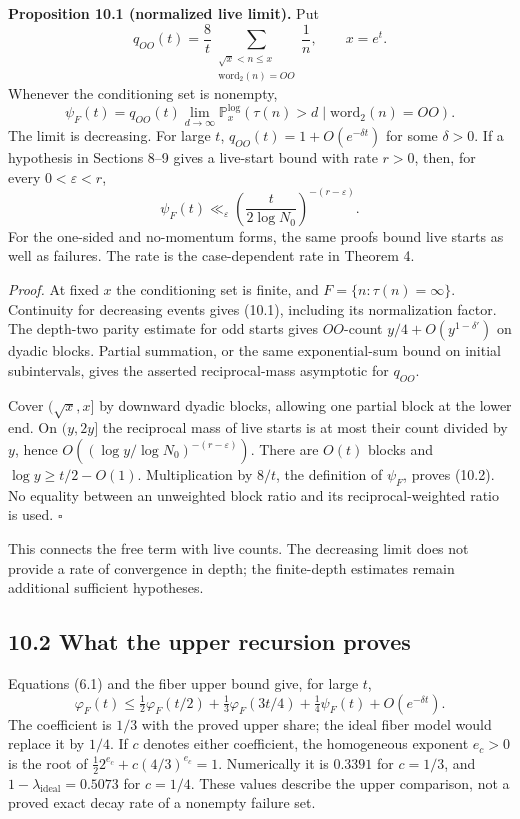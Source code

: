 \documentclass[11pt,a4paper]{article}
\begin{document}
\textbf{Proposition 10.1 (normalized live limit).} Put \[
q_{OO}(t)=\frac8t
 \sum_{\substack{\sqrt x<n\le x\\ \mathrm{word}_2(n)=OO}}\frac1n,
\qquad x=e^t.
\] Whenever the conditioning set is nonempty, \[
\psi_F(t)=q_{OO}(t)\lim_{d\to\infty}
 \mathbb P_x^{\log}(\tau(n)>d\mid\mathrm{word}_2(n)=OO).
\tag{10.1}
\] The limit is decreasing. For large \(t\),
\(q_{OO}(t)=1+O(e^{-\delta t})\) for some \(\delta>0\). If a hypothesis
in Sections 8--9 gives a live-start bound with rate \(r>0\), then, for
every \(0<\varepsilon<r\), \[
\psi_F(t)\ll_\varepsilon
 \left(\frac{t}{2\log N_0}\right)^{-(r-\varepsilon)}.
\tag{10.2}
\] For the one-sided and no-momentum forms, the same proofs bound live
starts as well as failures. The rate is the case-dependent rate in
Theorem 4.

\emph{Proof.} At fixed \(x\) the conditioning set is finite, and
\(F=\{n:\tau(n)=\infty\}\). Continuity for decreasing events gives
(10.1), including its normalization factor. The depth-two parity
estimate for odd starts gives \(OO\)-count \(y/4+O(y^{1-\delta'})\) on
dyadic blocks. Partial summation, or the same exponential-sum bound on
initial subintervals, gives the asserted reciprocal-mass asymptotic for
\(q_{OO}\).

Cover \((\sqrt x,x]\) by downward dyadic blocks, allowing one partial
block at the lower end. On \((y,2y]\) the reciprocal mass of live starts
is at most their count divided by \(y\), hence
\(O((\log y/\log N_0)^{-(r-\varepsilon)})\). There are \(O(t)\) blocks
and \(\log y\ge t/2-O(1)\). Multiplication by \(8/t\), the definition of
\(\psi_F\), proves (10.2). No equality between an unweighted block ratio
and its reciprocal-weighted ratio is used. \(\square\)

This connects the free term with live counts. The decreasing limit does
not provide a rate of convergence in depth; the finite-depth estimates
remain additional sufficient hypotheses.

\subsection{10.2 What the upper recursion
proves}\label{what-the-upper-recursion-proves}

Equations (6.1) and the fiber upper bound give, for large \(t\), \[
\varphi_F(t)\le\tfrac12\varphi_F(t/2)
 +\tfrac13\varphi_F(3t/4)+\tfrac14\psi_F(t)+O(e^{-\delta t}).
\tag{10.3}
\] The coefficient is \(1/3\) with the proved upper share; the ideal
fiber model would replace it by \(1/4\). If \(c\) denotes either
coefficient, the homogeneous exponent \(e_c>0\) is the root of
\(\tfrac12 2^{e_c}+c(4/3)^{e_c}=1\). Numerically it is \(0.3391\) for
\(c=1/3\), and \(1-\lambda_{\mathrm{ideal}}=0.5073\) for \(c=1/4\).
These values describe the upper comparison, not a proved exact decay
rate of a nonempty failure set.
\end{document}
